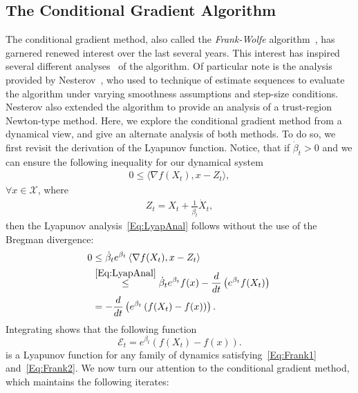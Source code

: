 \documentclass[11pt]{article}
\theoremstyle{plain}
\newcommand{\X}{{\mathcal X}}
\begin{document}
\subsection{The Conditional Gradient Algorithm}
\label{Sec:CondGrad}
 The conditional gradient method, also called the \emph{Frank-Wolfe} algorithm~\cite{FrankWolfe}, has garnered renewed interest over the last several years. This interest has inspired several different analyses~\cite{Freund14, Bach15} of the algorithm. Of particular note is the analysis provided by Nesterov~\cite{NesterovCond15}, who used to technique of estimate sequences to evaluate the algorithm under varying smoothness assumptions and step-size conditions. Nesterov also extended the algorithm to provide an analysis of a trust-region Newton-type method. Here, we explore the conditional gradient method from a dynamical view, and give an alternate analysis of both methods. To do so, we first revisit the derivation of the Lyapunov function. Notice, that if $\dot \beta_t >0 $ and we can ensure the following inequality for our dynamical system
\begin{align}\label{Eq:Frank1} 
0 \leq \langle \nabla f(X_t), x-  Z_t\rangle,
\end{align}
 $\forall x \in \X $, where 
\begin{align}\label{Eq:Frank2}
Z_t = X_t + \frac{1}{\dot \beta_t} \dot X_t,
\end{align}
then the Lyapunov analysis~\eqref{Eq:LyapAnal} follows without the use of the Bregman divergence: 
\begin{subequations}\label{Eq:LyapAnalFrank}
\begin{align}
0 &\leq  
\dot \beta_t e^{\beta_t} \left\langle \nabla f(X_t), x -Z_t\right\rangle \,  \notag\\
& \overset{\eqref{Eq:LyapAnal}}{\leq}  \dot \beta_t e^{\beta_t} f(x) -\frac{d}{dt}\left( e^{ \beta_t}  f(X_t)\right)\, \notag\\
& = -\frac{d}{dt} \left( e^{\beta_t}\left(f(X_t) - f(x)\right)\right). \notag
\end{align}
\end{subequations}
Integrating shows that the following function 
\begin{equation}\label{Eq:FrankE}
\mathcal{E}_t = e^{\beta_t} (f(X_t) - f(x)).
\end{equation} 
is a Lyapunov function for any family of dynamics satisfying~\eqref{Eq:Frank1} and~\eqref{Eq:Frank2}.  We now turn our attention to the conditional gradient method, which maintains the following iterates: 
\end{document}
